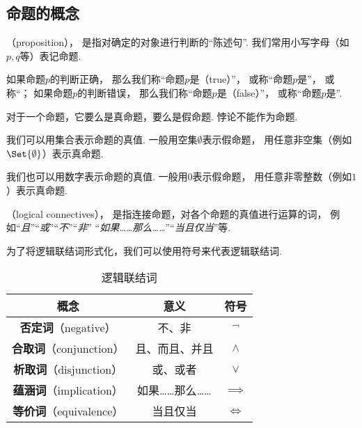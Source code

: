\subsection{命题的概念}
\begin{definition}
（proposition），%
是指对确定的对象进行判断的“陈述句”.
我们常用小写字母（如\(p,q\)等）表记命题.
\end{definition}

\begin{definition}
如果命题\(p\)的判断正确，%
那么我们称“命题\(p\)是（true）”，%
或称“命题\(p\)是”，
或称“；
如果命题\(p\)的判断错误，%
那么我们称“命题\(p\)是（false）”，%
或称“命题\(p\)是”.
\end{definition}

对于一个命题，它要么是真命题，要么是假命题.
悖论不能作为命题.

我们可以用集合表示命题的真值.
一般用空集\(\emptyset\)表示假命题，%
用任意非空集（例如\(\Set{\emptyset}\)）表示真命题.

我们也可以用数字表示命题的真值.
一般用\(0\)表示假命题，%
用任意非零整数（例如\(1\)）表示真命题.

\begin{definition}
（logical connectives），%
是指连接命题，对各个命题的真值进行运算的词，%
例如“\emph{且}”“\emph{或}”“\emph{不}”“\emph{非}”%
“\emph{如果……那么……}”“\emph{当且仅当}”等.
\end{definition}

为了将逻辑联结词形式化，我们可以使用符号来代表逻辑联结词.

\begin{table}[bp]
\centering
\begin{tabular}{|*{3}{c|}}
\hline
{\bf 概念} & {\bf 意义} & {\bf 符号} \\ \hline
{\bf 否定词}（negative） & 不、非 & \(\neg\) \\ \hline
{\bf 合取词}（conjunction） & 且、而且、并且 & \(\land\) \\ \hline
{\bf 析取词}（disjunction） & 或、或者 & \(\lor\) \\ \hline
{\bf 蕴涵词}（implication） & 如果……那么…… & \(\implies\) \\ \hline
{\bf 等价词}（equivalence） & 当且仅当 & \(\iff\) \\ \hline
\end{tabular}
\caption{逻辑联结词}
\end{table}


